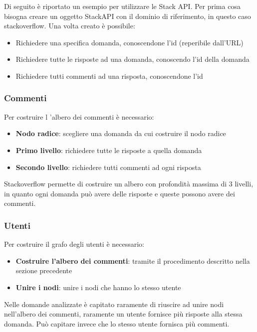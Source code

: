 Di seguito è riportato un esempio per utilizzare le Stack API. Per prima cosa bisogna creare un oggetto StackAPI con il dominio di riferimento, in questo caso stackoverflow. Una volta creato è possibile:

\begin{itemize}
    \item Richiedere una specifica domanda, conoscendone l'id (reperibile dall'URL)
    \item Richiedere tutte le risposte ad una domanda, conoscendo l'id della domanda
    \item Richiedere tutti commenti ad una risposta, conoscendone l'id
\end{itemize}

\subsubsection {Commenti}

Per costruire l 'albero dei commenti è necessario:

\begin{itemize}
    \item \textbf{Nodo radice}: scegliere una domanda da cui costruire il nodo radice
    \item \textbf{Primo livello}: richiedere tutte le risposte a quella domanda
    \item \textbf{Secondo livello}: richiedere tutti commenti ad ogni risposta
\end{itemize}

Stackoverflow permette di costruire un albero con profondità massima di 3 livelli, in quanto ogni domanda può avere delle risposte e queste possono avere dei commenti.
 

\subsubsection {Utenti}
Per costruire il grafo degli utenti è necessario:

\begin{itemize}
    \item \textbf{Costruire l'albero dei commenti}: tramite il procedimento descritto nella sezione precedente
    \item \textbf{Unire i nodi}: unire i nodi che hanno lo stesso utente
\end{itemize}

Nelle domande analizzate è capitato raramente di riuscire ad unire nodi nell'albero dei commenti, raramente un utente fornisce più risposte alla stessa domanda. Può capitare invece che lo stesso utente fornisca più commenti. 


